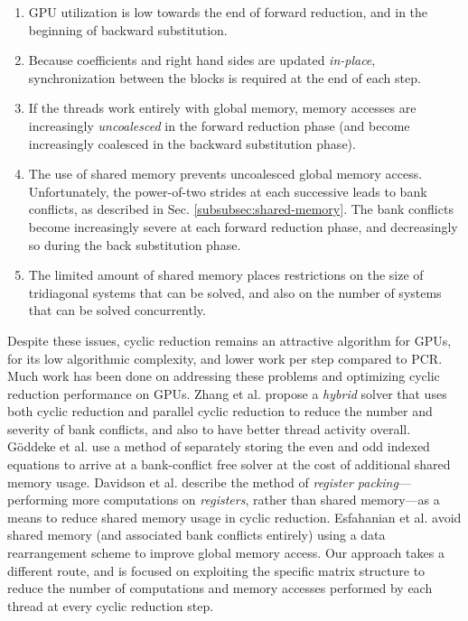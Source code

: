 \begin{enumerate}
\item GPU utilization is low towards the end of forward reduction,
    and in the beginning of backward substitution.

\item Because coefficients and right hand sides
    are updated \emph{in-place},
    synchronization between the blocks is required at
    the end of each step.

\item If the threads work entirely with global memory,
    memory accesses are increasingly
    \emph{uncoalesced} in the forward reduction phase
    (and become increasingly coalesced in the
    backward substitution phase).

\item The use of shared memory prevents
    uncoalesced global memory access.
    Unfortunately,
    the power-of-two strides at each successive
    leads to bank conflicts,
    as described in Sec. \ref{subsubsec:shared-memory}.
    The bank conflicts become increasingly severe
    at each forward reduction phase,
    and decreasingly so during the back substitution phase.
    
\item The limited amount of shared memory places restrictions
    on the size of tridiagonal systems that can be solved,
    and also on the number of systems that can be solved
    concurrently.
\end{enumerate}

Despite these issues,
cyclic reduction remains an attractive algorithm
for GPUs,
for its low algorithmic complexity,
and lower work per step compared to PCR.
Much work has been done on
addressing these problems and
optimizing cyclic reduction performance on GPUs.
Zhang et al. \cite{Zhang2010FTS} propose a
\emph{hybrid} solver
that uses both cyclic reduction and parallel cyclic reduction
to reduce the number and severity of bank conflicts,
and also to have better thread activity overall.
G{\"o}ddeke et al. \cite{GoSt11CR}
use a method of separately storing
the even and odd indexed equations
to arrive at a bank-conflict free solver
at the cost of additional shared memory usage.
Davidson et al. \cite{davidson2011register}
describe the method of
\emph{register packing}---performing more computations
on \emph{registers}, rather than shared memory---as
a means to reduce shared memory usage in cyclic reduction.
Esfahanian et al. \cite{esfahanian2014efficient}
avoid shared memory (and associated bank conflicts entirely)
using a data rearrangement scheme to improve global memory access.
Our approach takes a different route,
and is focused on exploiting the specific matrix structure
to reduce the number of computations and memory accesses
performed by each thread
at every cyclic reduction step.

